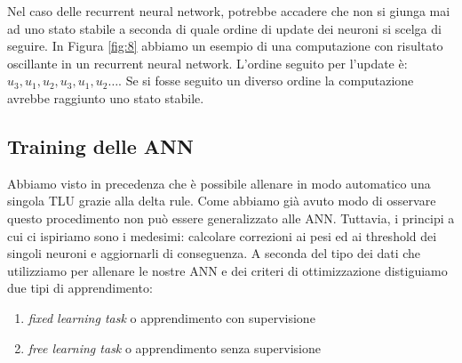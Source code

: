 \documentclass[10pt,a4paper]{article}
\begin{document}
Nel caso delle recurrent neural network, potrebbe accadere che non si giunga mai ad uno stato stabile a seconda di quale ordine di update dei neuroni si scelga di seguire. In Figura \ref{fig:8} abbiamo un esempio di una computazione con risultato oscillante in un recurrent neural network. L'ordine seguito per l'update è: $u_3,u_1,u_2,u_3,u_1,u_2\dots$. Se si fosse seguito un diverso ordine la computazione avrebbe raggiunto uno stato stabile.

\subsection{Training delle ANN}

Abbiamo visto in precedenza che è possibile allenare in modo automatico una singola TLU grazie alla delta rule. Come abbiamo già avuto modo di osservare questo procedimento non può essere generalizzato alle ANN. Tuttavia, i principi a cui ci ispiriamo sono i medesimi: calcolare correzioni ai pesi ed ai threshold dei singoli neuroni e aggiornarli di conseguenza. A seconda del tipo dei dati che utilizziamo per allenare le nostre ANN e dei criteri di ottimizzazione distiguiamo due tipi di apprendimento:

\begin{enumerate}
\item{\emph{fixed learning task} o apprendimento con supervisione}
\item{\emph{free learning task} o apprendimento senza supervisione}
\end{enumerate}
\end{document}
